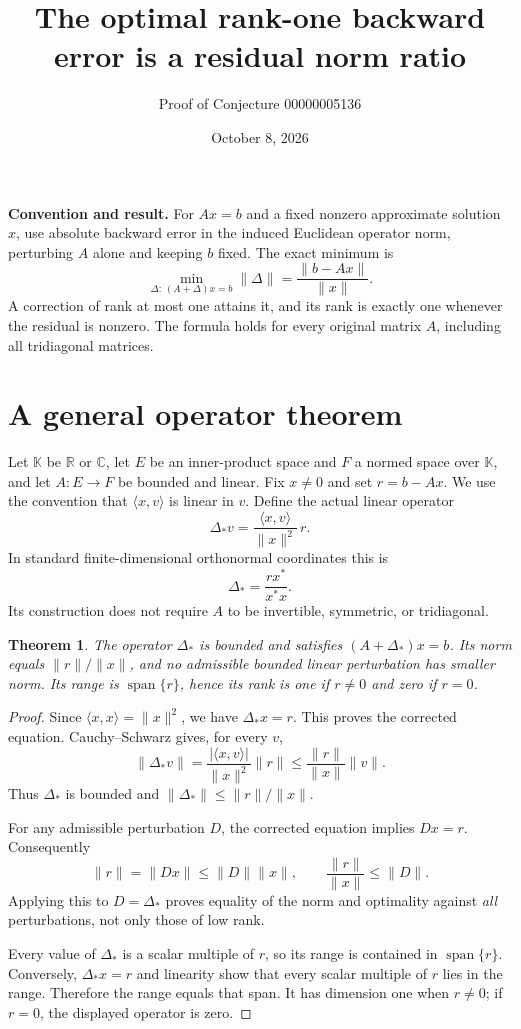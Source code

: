 \documentclass[11pt]{article}
\title{The optimal rank-one backward error is a residual norm ratio}
\author{Proof of Conjecture 00000005136}
\date{October 8, 2026}
\newtheorem{theorem}{Theorem}
\begin{document}
\maketitle
\noindent\textbf{Convention and result.} For $Ax=b$ and a fixed nonzero approximate solution $x$, use absolute backward error in the induced Euclidean operator norm, perturbing $A$ alone and keeping $b$ fixed. The exact minimum is
\[
 \min_{\Delta:\,(A+\Delta)x=b}\|\Delta\|
 =\frac{\|b-Ax\|}{\|x\|}.
\]
A correction of rank at most one attains it, and its rank is exactly one whenever the residual is nonzero. The formula holds for every original matrix $A$, including all tridiagonal matrices.

\section*{A general operator theorem}
Let $\mathbb K$ be $\mathbb R$ or $\mathbb C$, let $E$ be an inner-product space and $F$ a normed space over $\mathbb K$, and let $A:E\to F$ be bounded and linear. Fix $x\ne0$ and set $r=b-Ax$. We use the convention that $\langle x,v\rangle$ is linear in $v$. Define the actual linear operator
\[
 \Delta_*v=\frac{\langle x,v\rangle}{\|x\|^2}\,r.
\]
In standard finite-dimensional orthonormal coordinates this is
\[
 \Delta_*=\frac{r x^*}{x^*x}.
\]
Its construction does not require $A$ to be invertible, symmetric, or tridiagonal.

\begin{theorem}
The operator $\Delta_*$ is bounded and satisfies $(A+\Delta_*)x=b$. Its norm equals $\|r\|/\|x\|$, and no admissible bounded linear perturbation has smaller norm. Its range is $\operatorname{span}\{r\}$, hence its rank is one if $r\ne0$ and zero if $r=0$.
\end{theorem}
\begin{proof}
Since $\langle x,x\rangle=\|x\|^2$, we have $\Delta_*x=r$. This proves the corrected equation. Cauchy--Schwarz gives, for every $v$,
\[
 \|\Delta_*v\|=\frac{|\langle x,v\rangle|}{\|x\|^2}\|r\|
 \leq\frac{\|r\|}{\|x\|}\|v\|.
\]
Thus $\Delta_*$ is bounded and $\|\Delta_*\|\leq\|r\|/\|x\|$.

\newpage
For any admissible perturbation $D$, the corrected equation implies $Dx=r$. Consequently
\[
 \|r\|=\|Dx\|\leq\|D\|\|x\|,
 \qquad\frac{\|r\|}{\|x\|}\leq\|D\|.
\]
Applying this to $D=\Delta_*$ proves equality of the norm and optimality against \emph{all} perturbations, not only those of low rank.

Every value of $\Delta_*$ is a scalar multiple of $r$, so its range is contained in $\operatorname{span}\{r\}$. Conversely, $\Delta_*x=r$ and linearity show that every scalar multiple of $r$ lies in the range. Therefore the range equals that span. It has dimension one when $r\ne0$; if $r=0$, the displayed operator is zero.
\end{proof}
\end{document}
